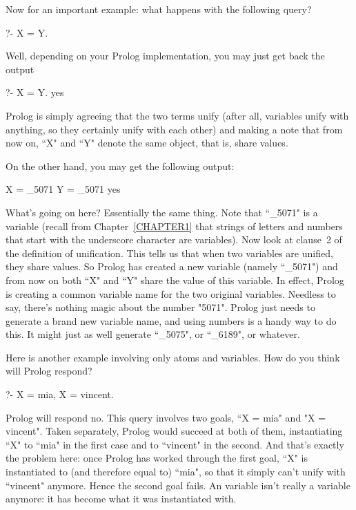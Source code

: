 Now for an important example: what happens with the following query?
\begin{LPNcodedisplay}
?- X = Y.
\end{LPNcodedisplay}
%
Well, depending on your Prolog implementation, you may just get back
the output
\begin{LPNcodedisplay}
?- X = Y.
yes
\end{LPNcodedisplay}
%
Prolog is simply agreeing that the two terms unify (after all,
variables unify with anything, so they certainly unify with each
other) and making a note that from now on, ``X" and ``Y" denote the same
object, that is, share values.

On the other hand, you may get the following output:
\begin{LPNcodedisplay}
X = _5071
Y = _5071
yes
\end{LPNcodedisplay}
What's going on here?  Essentially the same thing. Note that ``\_5071"
is a variable (recall from Chapter~\ref{CHAPTER1} that strings of
letters and numbers that start with the underscore character are
variables).  Now look at clause~2 of the definition of
unification. This tells us that when two variables are unified, they
share values. So Prolog has created a new variable (namely ``\_5071")
and from now on both ``X" and ``Y" share the value of this variable. In
effect, Prolog is creating a common variable name for the two original
variables.  Needless to say, there's nothing magic about the number
"5071".  Prolog just needs to generate a brand new variable name, and
using numbers is a handy way to do this. It might just as well
generate ``\_5075", or ``\_6189", or whatever.

Here is another example involving only atoms and variables. How do you
think will Prolog respond?
\begin{LPNcodedisplay}
?- X = mia, X = vincent.
\end{LPNcodedisplay}


Prolog will respond no. This query involves two goals, ``X = mia" and
"X = vincent". Taken separately, Prolog would succeed at both of them,
instantiating ``X" to ``mia" in the first case and to ``vincent" in the
second. And that's exactly the problem here: once Prolog has worked
through the first goal, ``X" is instantiated to (and therefore equal
to) ``mia", so that it simply can't unify with ``vincent" anymore.
Hence the second goal fails. An  variable isn't
really a variable anymore: it has become what it was instantiated with.

